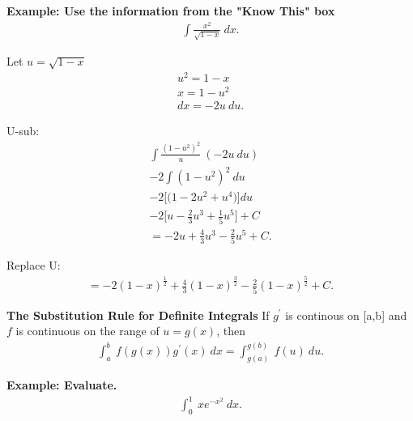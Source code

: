 \documentclass{report}
\begin{document}
  \pagebreak \bigbreak \noindent
  \begin{mdframed}
    \textbf{Example: Use the information from the "Know This" box}
    \begin{align*}
      \int \frac{x^{2}}{\sqrt{1-x}}\ dx
    .\end{align*}
  \end{mdframed}

  \bigbreak \noindent \bigbreak \noindent
  Let $u=\sqrt{1-x}$
  \begin{align*}
    u^{2} = 1-x \\
    x = 1-u^{2} \\
    dx = -2u\ du
  .\end{align*}

  \bigbreak \noindent \bigbreak \noindent
  U-sub:
  \begin{align*}
    \int \frac{(1-u^{2})^{2}}{u}\ (-2u\ du)  \\
    -2 \int (1-u^{2})^{2}\ du \\
    -2 \bigg[\big(1-2u^{2}+u^{4}\big)\bigg] du \\
    -2 \bigg[u-\frac{2}{3}u^{3}+\frac{1}{5}u^{5}\bigg] + C \\
    = -2u+\frac{4}{3}u^{3} -\frac{2}{5}u^{5} + C 
  .\end{align*}

  \bigbreak \noindent \bigbreak \noindent
  Replace U:
  \begin{align*}
    \boxed{=-2(1-x)^{\frac{1}{2}} + \frac{4}{3}(1-x)^{\frac{3}{2}} -\frac{2}{5}(1-x)^{\frac{5}{2}} + C}
  .\end{align*}

  \pagebreak \bigbreak \noindent
  \begin{mdframed}
    \textbf{The Substitution Rule for Definite Integrals}
    \bigbreak \noindent \bigbreak \noindent
    If $g^{\prime}$ is continous on [a,b] and $f$ is continuous on the range of $u=g(x)$, then
    \begin{align*}
      \int_{a}^{b}\ f(g(x))g^{\prime}(x)\ dx = \int_{g(a)}^{g(b)}\ f(u)\ du
    .\end{align*}

    \bigbreak \noindent \bigbreak \noindent
    \bigbreak \noindent 
  \end{mdframed}

  \bigbreak \noindent 
  \begin{mdframed}
    \textbf{Example: Evaluate.}
    \begin{align*}
      \int_{0}^{1}\ xe^{-x^{2}}\ dx
    .\end{align*}
  \end{mdframed}
\end{document}
